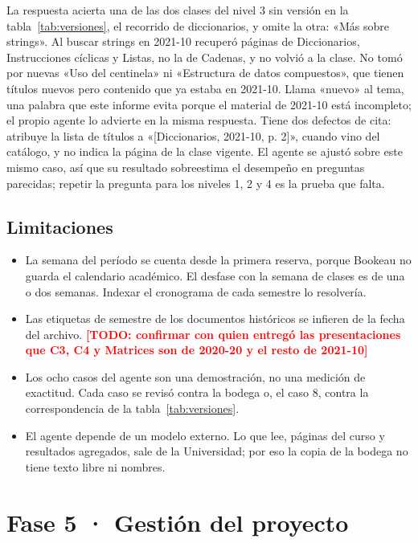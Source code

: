 \documentclass[11pt,letterpaper]{article}
\newcommand{\pendiente}[1]{\textcolor{red}{\textbf{[TODO: #1]}}}
\begin{document}
La respuesta acierta una de las dos clases del nivel 3 sin versión en la tabla~\ref{tab:versiones}, el recorrido de diccionarios, y omite la otra: «Más sobre strings». Al buscar strings en 2021-10 recuperó páginas de Diccionarios, Instrucciones cíclicas y Listas, no la de Cadenas, y no volvió a la clase. No tomó por nuevas «Uso del centinela» ni «Estructura de datos compuestos», que tienen títulos nuevos pero contenido que ya estaba en 2021-10. Llama «nuevo» al tema, una palabra que este informe evita porque el material de 2021-10 está incompleto; el propio agente lo advierte en la misma respuesta. Tiene dos defectos de cita: atribuye la lista de títulos a «[Diccionarios, 2021-10, p. 2]», cuando vino del catálogo, y no indica la página de la clase vigente. El agente se ajustó sobre este mismo caso, así que su resultado sobreestima el desempeño en preguntas parecidas; repetir la pregunta para los niveles 1, 2 y 4 es la prueba que falta.

\subsection{Limitaciones}

\begin{itemize}[leftmargin=1.5em,itemsep=2pt]
\item La semana del período se cuenta desde la primera reserva, porque Bookeau no guarda el calendario académico. El desfase con la semana de clases es de una o dos semanas. Indexar el cronograma de cada semestre lo resolvería.
\item Las etiquetas de semestre de los documentos históricos se infieren de la fecha del archivo. \pendiente{confirmar con quien entregó las presentaciones que C3, C4 y Matrices son de 2020-20 y el resto de 2021-10}
\item Los ocho casos del agente son una demostración, no una medición de exactitud. Cada caso se revisó contra la bodega o, el caso 8, contra la correspondencia de la tabla~\ref{tab:versiones}.
\item El agente depende de un modelo externo. Lo que lee, páginas del curso y resultados agregados, sale de la Universidad; por eso la copia de la bodega no tiene texto libre ni nombres.
\end{itemize}

\section{Fase 5 · Gestión del proyecto}
\end{document}
